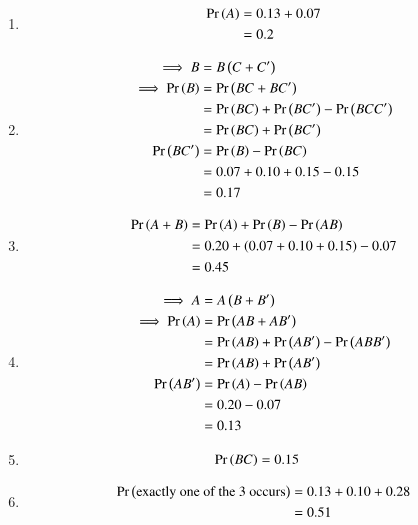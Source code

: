 \documentclass[journal,11pt,onecolumn]{IEEEtran}
\begin{document}
\begin{enumerate}
\item \begin{align}
	\Pr\left(A\right)&= 0.13+0.07\\
	&=0.2
	\end{align}
\item \begin{align}
	\implies B&=B\left(C+C'\right)\\
	\implies \Pr\left(B\right)&=\Pr\left(BC+BC'\right)\\
	&=\Pr\left(BC\right)+\Pr\left(BC'\right)-\Pr\left(BCC'\right)\\
	&=\Pr\left(BC\right)+\Pr\left(BC'\right)\\
	\Pr\left(BC'\right) &= \Pr\left(B\right)-\Pr\left(BC\right)\\
	&=0.07+0.10+0.15-0.15\\
	&=0.17
\end{align}
\item \begin{align}
	\Pr\left(A+B\right)&= \Pr\left(A\right)+\Pr\left(B\right) -\Pr\left(AB\right)\\
	&=0.20+\left(0.07+0.10+0.15\right)-0.07\\
	&=0.45
\end{align} 
\item \begin{align}
	\implies A&=A\left(B+B'\right)\\
	\implies \Pr\left(A\right)&=\Pr\left(AB+AB'\right)\\
	&=\Pr\left(AB\right)+\Pr\left(AB'\right)-\Pr\left(ABB'\right)\\
	&=\Pr\left(AB\right)+\Pr\left(AB'\right)\\
	\Pr\left(AB'\right)&=\Pr\left(A\right)-\Pr\left(AB\right)\\
	&=0.20-0.07\\
	&=0.13
\end{align}
\item \begin{align}
	\Pr\left(BC\right)&=0.15
\end{align} 
\item \begin{align}
	\Pr\left(\text{exactly one of the 3 occurs}\right) &= 0.13+0.10+0.28\\
	&=0.51
\end{align} 
\end{enumerate}
\end{document}
